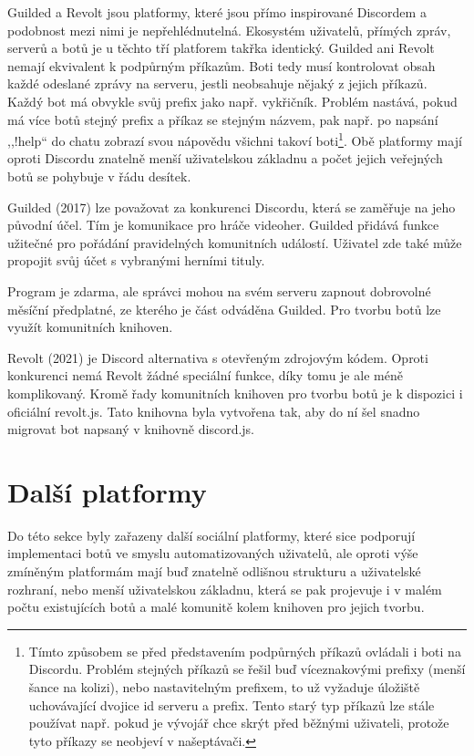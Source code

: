 \documentclass[FM]{tulthesis}
\begin{document}
	Guilded a Revolt jsou platformy, které jsou přímo inspirované Discordem a podobnost mezi nimi je nepřehlédnutelná. Ekosystém uživatelů, přímých zpráv, serverů a botů je u těchto tří platforem takřka identický. Guilded ani Revolt nemají ekvivalent k podpůrným příkazům. Boti tedy musí kontrolovat obsah každé odeslané zprávy na serveru, jestli neobsahuje nějaký z jejich příkazů. Každý bot má obvykle svůj prefix jako např. vykřičník. Problém nastává, pokud má více botů stejný prefix a příkaz se stejným názvem, pak např. po napsání ,,!help`` do chatu zobrazí svou nápovědu všichni takoví boti\footnote{Tímto způsobem se před představením podpůrných příkazů ovládali i boti na Discordu. Problém stejných příkazů se řešil buď víceznakovými prefixy (menší šance na kolizi), nebo nastavitelným prefixem, to už vyžaduje úložiště uchovávající dvojice id serveru a prefix. Tento starý typ příkazů lze stále používat např. pokud je vývojář chce skrýt před běžnými uživateli, protože tyto příkazy se neobjeví v našeptávači.}. Obě platformy mají oproti Discordu znatelně menší uživatelskou základnu a počet jejich veřejných botů se pohybuje v řádu desítek.
	
	Guilded (2017) lze považovat za konkurenci Discordu, která se zaměřuje na jeho původní účel. Tím je komunikace pro hráče videoher. Guilded přidává funkce užitečné pro pořádání pravidelných komunitních událostí. Uživatel zde také může propojit svůj účet s vybranými herními tituly. \cite{web_guilded} 
	
	Program je zdarma, ale správci mohou na svém serveru zapnout dobrovolné měsíční předplatné, ze kterého je část odváděna Guilded. Pro tvorbu botů lze využít komunitních knihoven.
	
	Revolt (2021) je Discord alternativa s otevřeným zdrojovým kódem. Oproti konkurenci nemá Revolt žádné speciální funkce, díky tomu je ale méně komplikovaný. Kromě řady komunitních knihoven pro tvorbu botů je k dispozici i oficiální revolt.js. Tato knihovna byla vytvořena tak, aby do ní šel snadno migrovat bot napsaný v knihovně discord.js.
	
	\section{Další platformy}
	
	Do této sekce byly zařazeny další sociální platformy, které sice podporují implementaci botů ve smyslu automatizovaných uživatelů, ale oproti výše zmíněným platformám mají buď znatelně odlišnou strukturu a uživatelské rozhraní, nebo menší uživatelskou základnu, která se pak projevuje i v malém počtu existujících botů a malé komunitě kolem knihoven pro jejich tvorbu.
	
\end{document}
